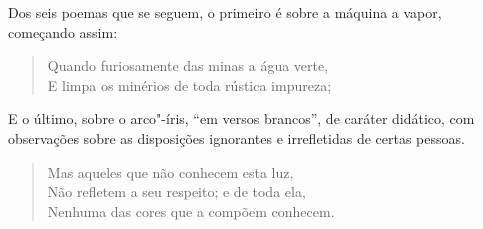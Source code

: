 Dos seis poemas que se seguem, o primeiro é sobre a máquina a vapor,
começando assim:

\begin{verse}
Quando furiosamente das minas a água verte,\\
E limpa os minérios de toda rústica impureza;\footnotemark
\end{verse}

E o último, sobre o arco"-íris, ``em versos brancos'', de caráter
didático, com observações sobre as disposições ignorantes e irrefletidas
de certas pessoas.

\begin{verse}
Mas aqueles que não conhecem esta luz,\\
Não refletem a seu respeito; e de toda ela,\\
Nenhuma das cores que a compõem conhecem.\footnotemark
\end{verse}


